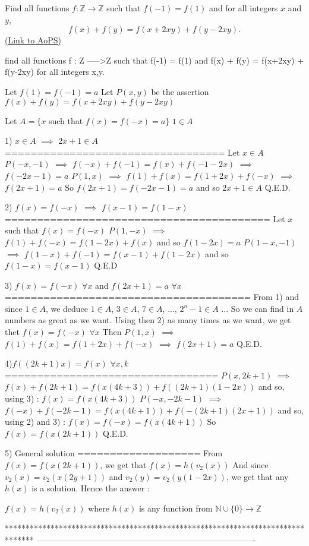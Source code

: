 \begin{problem}
	Find all functions $f: \mathbb Z \to \mathbb Z$ such that $f(-1) = f(1)$ and for all integers $x$ and $y$,
\[f(x) + f(y) = f(x+2xy) + f(y-2xy).\]
	\flushright \href{https://artofproblemsolving.com/community/c6h386360}{(Link to AoPS)}
\end{problem}



\begin{solution}
	\begin{tcolorbox}find all functions f : Z ----->Z such that f(-1) = f(1) and
f(x) + f(y) = f(x+2xy) + f(y-2xy) for all integers x,y.\end{tcolorbox}
Let $f(1)=f(-1)=a$
Let $P(x,y)$ be the assertion $f(x)+f(y)=f(x+2xy)+f(y-2xy)$

Let $A=\{x$ such that $f(x)=f(-x)=a\}$
$1\in A$

1) $x\in A$ $\implies$ $2x+1\in A$
==================================
Let $x\in A$
$P(-x,-1)$ $\implies$ $f(-x)+f(-1)=f(x)+f(-1-2x)$ $\implies$ $f(-2x-1)=a$
$P(1,x)$ $\implies$ $f(1)+f(x)=f(1+2x)+f(-x)$ $\implies$ $f(2x+1)=a$
So $f(2x+1)=f(-2x-1)=a$ and so $2x+1\in A$
Q.E.D.

2) $f(x)=f(-x)$ $\implies$ $f(x-1)=f(1-x)$
=========================================
Let $x$ such that $f(x)=f(-x)$
$P(1,-x)$ $\implies$ $f(1)+f(-x)=f(1-2x)+f(x)$ and so $f(1-2x)=a$
$P(1-x,-1)$ $\implies$ $f(1-x)+f(-1)=f(x-1)+f(1-2x)$ and so $f(1-x)=f(x-1)$
Q.E.D

3) $f(x)=f(-x)$ $\forall x$ and $f(2x+1)=a$ $\forall x$
======================================
From 1) and since $1\in A$, we deduce $1\in A$, $3\in A$, $7\in A$, ..., $2^n-1\in A$ ...
So we can find in $A$ numbers as great as we want.
Using then 2) as many times as we want, we get thet $f(x)=f(-x)$ $\forall x$
Then $P(1,x)$ $\implies$ $f(1)+f(x)=f(1+2x)+f(-x)$ $\implies$ $f(2x+1)=a$
Q.E.D.

4)$f((2k+1)x)=f(x)$ $\forall x,k$
=================================
$P(x,2k+1)$ $\implies$ $f(x)+f(2k+1)=f(x(4k+3))+f((2k+1)(1-2x))$ and so, using 3) : $f(x)=f(x(4k+3))$
$P(-x,-2k-1)$ $\implies$ $f(-x)+f(-2k-1)=f(x(4k+1))+f(-(2k+1)(2x+1))$ and so, using 2) and 3) : $f(x)=f(-x)=f(x(4k+1))$
So $f(x)=f(x(2k+1))$
Q.E.D.

5) General solution
===================
From $f(x)=f(x(2k+1))$, we get that $f(x)=h(v_2(x))$
And since $v_2(x)=v_2(x(2y+1))$ and $v_2(y)=v_2(y(1-2x))$, we get that any $h(x)$ is a solution.
Hence the answer :

$\boxed{f(x)=h(v_2(x))}$ where $h(x)$ is any function from $\mathbb N\cup\{0\}\to \mathbb Z$
\end{solution}
*******************************************************************************
-------------------------------------------------------------------------------

